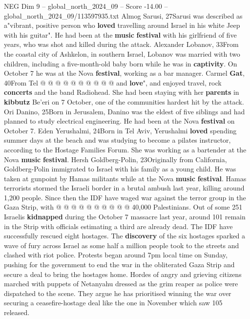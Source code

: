 \begin{textsample}{NEG Dim 9 – global\_north\_2024\_09 – Score -14.00 – global\_north\_2024\_09/113597935.txt}
Almog Sarusi, 27Sarusi was described as a"vibrant, positive person who \textbf{loved} travelling around Israel in his white Jeep with his guitar".
He had been at the \textbf{music} \textbf{festival} with his girlfriend of five years, who was shot and killed during the attack.
Alexander Lobanov, 33From the coastal city of Ashkelon, in southern Israel, Lobanov was married with two children, including a five-month-old baby born while he was in \textbf{captivity}.
On October 7 he was at the Nova \textbf{festival}, working as a bar manager.
Carmel \textbf{Gat}, 40From Tel @ @ @ @ @ @ @ @ @ @ and \textbf{love}", and enjoyed travel, rock \textbf{concerts} and the band Radiohead.
She had been staying with her \textbf{parents} in \textbf{kibbutz} Be'eri on 7 October, one of the communities hardest hit by the attack.
Ori Danino, 25Born in Jerusalem, Danino was the eldest of five siblings and had planned to study electrical engineering.
He had been at the Nova \textbf{festival} on October 7.
Eden Yerushalmi, 24Born in Tel Aviv, Yerushalmi \textbf{loved} spending summer days at the beach and was studying to become a pilates instructor, according to the Hostage Families Forum.
She was working as a bartender at the Nova \textbf{music} \textbf{festival}.
Hersh Goldberg-Polin, 23Originally from California, Goldberg-Polin immigrated to Israel with his family as a young child.
He was taken at gunpoint by Hamas militants while at the Nova \textbf{music} \textbf{festival}.
Hamas terrorists stormed the Israeli border in a brutal ambush last year, killing around 1,200 people.
Since then the IDF have waged war against the terror group in the Gaza Strip, with @ @ @ @ @ @ @ @ @ @ 40,000 Palestinians.
Out of some 251 Israelis \textbf{kidnapped} during the October 7 massacre last year, around 101 remain in the Strip with officials estimating a third are already dead.
The IDF have successfully rescued eight hostages.
The \textbf{discovery} of the six hostages sparked a wave of fury across Israel as some half a million people took to the streets and clashed with riot police.
Protests began around 7pm local time on Sunday, pushing for the government to end the war in the obliterated Gaza Strip and secure a deal to bring the hostages home.
Hordes of angry and grieving citizens marched with puppets of Netanyahu dressed as the grim reaper as police were dispatched to the scene.
They argue he has prioritised winning the war over securing a ceasefire-hostage deal like the one in November which saw 105 released.

\end{textsample}
